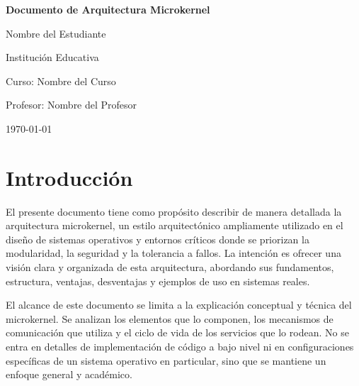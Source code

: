 \documentclass[12pt,a4paper]{article}
\begin{document}
\begin{titlepage}
\centering
\vspace*{2cm}

{\Large\bfseries Documento de Arquitectura Microkernel}

\vspace{2cm}

{\large Nombre del Estudiante}

\vspace{1cm}

{\large Institución Educativa}

\vspace{1cm}

{\large Curso: Nombre del Curso}

\vspace{1cm}

{\large Profesor: Nombre del Profesor}

\vspace{1cm}

{\large \today}

\end{titlepage}

\newpage
\thispagestyle{empty}
\mbox{}

\newpage
\setcounter{page}{1}

\section{Introducción}

El presente documento tiene como propósito describir de manera detallada la arquitectura microkernel, un estilo arquitectónico ampliamente utilizado en el diseño de sistemas operativos y entornos críticos donde se priorizan la modularidad, la seguridad y la tolerancia a fallos. La intención es ofrecer una visión clara y organizada de esta arquitectura, abordando sus fundamentos, estructura, ventajas, desventajas y ejemplos de uso en sistemas reales.

El alcance de este documento se limita a la explicación conceptual y técnica del microkernel. Se analizan los elementos que lo componen, los mecanismos de comunicación que utiliza y el ciclo de vida de los servicios que lo rodean. No se entra en detalles de implementación de código a bajo nivel ni en configuraciones específicas de un sistema operativo en particular, sino que se mantiene un enfoque general y académico.
\end{document}
